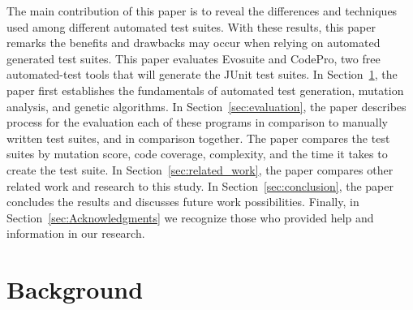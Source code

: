 \documentclass[conference]{IEEEtran}
\begin{document}
The main contribution of this paper is to reveal the differences and techniques used among different automated test suites. With these results, this paper remarks the benefits and drawbacks may occur when relying on automated generated test suites. This paper evaluates Evosuite and CodePro, two free automated-test tools that will generate the JUnit test suites. In Section~\ref{sec:background}, the paper first establishes the fundamentals of automated test generation, mutation analysis, and genetic algorithms. In Section~\ref{sec:evaluation}, the paper describes process for the evaluation each of these programs in comparison to manually written test suites, and in comparison together. The paper compares the test suites by mutation score, code coverage, complexity, and the time it takes to create the test suite. In Section~\ref{sec:related_work}, the paper compares other related work and research to this study. In Section~\ref{sec:conclusion}, the paper concludes the results and discusses future work possibilities. Finally, in Section~\ref{sec:Acknowledgments} we recognize those who provided help and information in our research.

\section{Background}
\label{sec:background}

\end{document}
